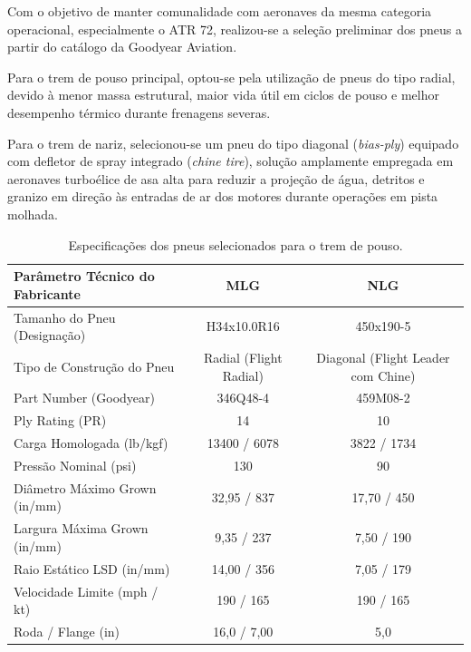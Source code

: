 Com o objetivo de manter comunalidade com aeronaves da mesma categoria operacional, especialmente o ATR 72, realizou-se a seleção preliminar dos pneus a partir do catálogo da Goodyear Aviation.

Para o trem de pouso principal, optou-se pela utilização de pneus do tipo radial, devido à menor massa estrutural, maior vida útil em ciclos de pouso e melhor desempenho térmico durante frenagens severas.

Para o trem de nariz, selecionou-se um pneu do tipo diagonal (\textit{bias-ply}) equipado com defletor de spray integrado (\textit{chine tire}), solução amplamente empregada em aeronaves turboélice de asa alta para reduzir a projeção de água, detritos e granizo em direção às entradas de ar dos motores durante operações em pista molhada.

\begin{table}[H]
    \centering
    \caption{Especificações dos pneus selecionados para o trem de pouso.}
    \vspace{0.2cm}
    
    \footnotesize
    \setlength{\tabcolsep}{4pt}
    
    \begin{tabular}{p{5.2cm}cc}
        \toprule
        \textbf{Parâmetro Técnico do Fabricante} & \textbf{MLG} & \textbf{NLG} \\
        \midrule
        Tamanho do Pneu (Designação) & H34x10.0R16 & 450x190-5 \\
        Tipo de Construção do Pneu & Radial (Flight Radial) & Diagonal (Flight Leader com Chine) \\
        Part Number (Goodyear) & 346Q48-4 & 459M08-2 \\
        Ply Rating (PR) & 14 & 10 \\
        Carga Homologada (lb/kgf) & 13400 / 6078 & 3822 / 1734 \\
        Pressão Nominal (psi) & 130 & 90 \\
        Diâmetro Máximo Grown (in/mm) & 32,95 / 837 & 17,70 / 450 \\
        Largura Máxima Grown (in/mm) & 9,35 / 237 & 7,50 / 190 \\
        Raio Estático LSD (in/mm) & 14,00 / 356 & 7,05 / 179 \\
        Velocidade Limite (mph / kt) & 190 / 165 & 190 / 165 \\
        Roda / Flange (in) & 16,0 / 7,00 & 5,0 \\
        \bottomrule
    \end{tabular}
    
    \label{tab:pneus_selecionados}
\end{table}


